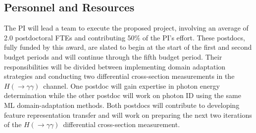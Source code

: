 \documentclass[letter, USenglish, 11pt, subfigure]{article}
\newcommand{\hyy}{\ensuremath{H(\to\gamma\gamma)}}
\begin{document}
\subsection{Personnel and Resources}
\label{sec:personnel}
The PI will lead a team to execute the proposed project, involving an average of 2.0 postdoctoral FTEs and contributing 50\% of the PI's effort. These postdocs, fully funded by this award, are slated to begin at the start of the first and second budget periods and will continue through the fifth budget period. Their responsibilities will be divided between implementing domain adaptation strategies and conducting two differential cross-section measurements in the \hyy\ channel. One postdoc will gain expertise in photon energy determination while the other postdoc will work on photon ID using the same ML domain-adaptation methods. Both postdocs will contribute to developing feature representation transfer and will work on preparing the next two iterations of the \hyy\ differential cross-section measurement.
\end{document}

